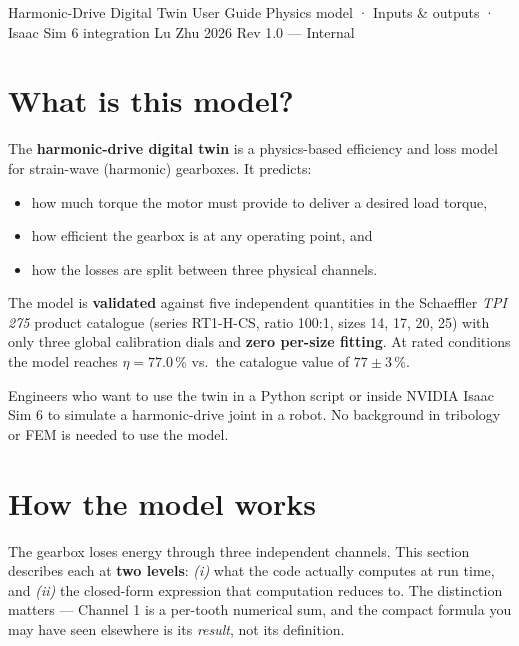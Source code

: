\documentclass[11pt,a4paper]{article}
\begin{document}
\schaefflertitlepage
  {Harmonic-Drive Digital Twin}
  {User Guide}
  {Physics model · Inputs \& outputs · Isaac Sim 6 integration}
  {Lu Zhu}
  {2026}
  {Rev 1.0 — Internal}

\tableofcontents
\clearpage

\section{What is this model?}

The \textbf{harmonic-drive digital twin} is a physics-based efficiency and
loss model for strain-wave (harmonic) gearboxes.  It predicts:

\begin{itemize}
  \item how much torque the motor must provide to deliver a desired load torque,
  \item how efficient the gearbox is at any operating point, and
  \item how the losses are split between three physical channels.
\end{itemize}

The model is \textbf{validated} against five independent quantities in the
Schaeffler \textit{TPI 275} product catalogue (series RT1-H-CS, ratio 100:1,
sizes 14, 17, 20, 25) with only three global calibration dials and
\textbf{zero per-size fitting}.  At rated conditions the model reaches
\(\eta = 77.0\,\%\) vs.\ the catalogue value of \(77 \pm 3\,\%\).

\begin{keyresult}
Engineers who want to use the twin in a Python script or inside NVIDIA
Isaac Sim 6 to simulate a harmonic-drive joint in a robot.
No background in tribology or FEM is needed to use the model.
\end{keyresult}

\section{How the model works}

The gearbox loses energy through three independent channels.  This
section describes each at \textbf{two levels}: \emph{(i)} what the code
actually computes at run time, and \emph{(ii)} the closed-form expression
that computation reduces to.  The distinction matters — Channel 1 is a
per-tooth numerical sum, and the compact formula you may have seen
elsewhere is its \emph{result}, not its definition.
\end{document}
